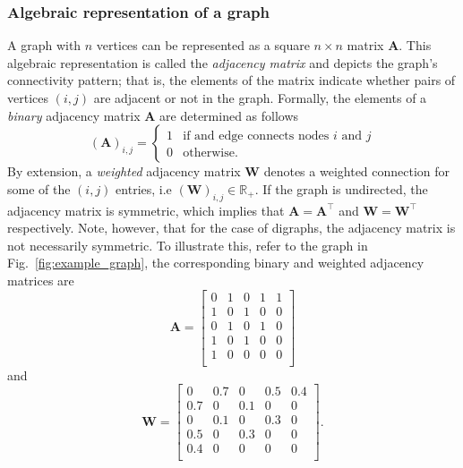 \subsubsection{Algebraic representation of a graph}
A graph with $n$ vertices can be represented as a square $n\times n$ matrix $\bm{A}$. This algebraic representation is called the \emph{adjacency matrix} and depicts the graph's connectivity pattern; that is, the elements of the matrix indicate whether pairs of vertices $\left(i,j\right)$ are adjacent or not in the graph. Formally,
the elements of a \emph{binary} adjacency matrix $\bm{A}$ are determined as follows
\begin{equation}
	\left(\bm{A}\right)_{i,j} =
	\begin{cases}
		1 & \text{if and edge connects nodes $i$ and $j$}\\
		0 & \text{otherwise}.
	\end{cases}
\end{equation}
By extension, a \emph{weighted} adjacency matrix $\bm{W}$ denotes a weighted connection for some of the $\left(i,j\right)$ entries, i.e $\left(\bm{W}\right)_{i,j} \in \mathbb{R}_+$. If the graph is undirected, the adjacency matrix is symmetric, which implies that $\bm{A}=\bm{A}^\intercal$ and $\bm{W}=\bm{W}^\intercal$respectively. Note, however, that for the case of digraphs, the adjacency matrix is not necessarily symmetric. To illustrate this, refer to the graph in Fig.~\ref{fig:example_graph}, the corresponding binary and weighted adjacency matrices are
\begin{equation*}
	\bm{A} = \begin{bmatrix}
		0 & 1 & 0 & 1 & 1\\
		1 & 0 & 1 & 0 & 0\\
		0 & 1 & 0 & 1 & 0\\
		1 & 0 & 1 & 0 & 0\\
		1 & 0 & 0 & 0 & 0\\
	\end{bmatrix}
\end{equation*} 
and
\begin{equation*}
	\bm{W} = \begin{bmatrix}
		0 & 0.7 & 0 & 0.5 & 0.4\\
		0.7 & 0 & 0.1 & 0 & 0\\
		0 & 0.1 & 0 & 0.3 & 0\\
		0.5 & 0 & 0.3 & 0 & 0\\
		0.4 & 0 & 0 & 0 & 0\\
	\end{bmatrix}.
\end{equation*} 

